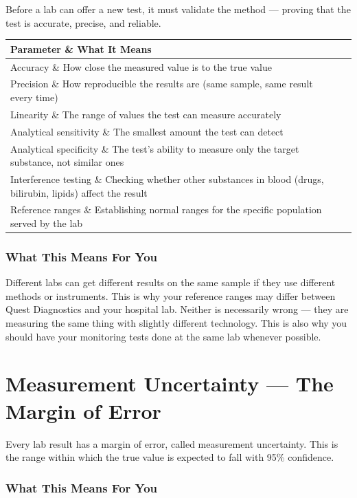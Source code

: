 Before a lab can offer a new test, it must validate the method --- proving that the test is accurate, precise, and reliable.

\begin{longtable}{@{}ll@{}}
\toprule
\textbf{Parameter} \& \textbf{What It Means} \\
\midrule
Accuracy \& How close the measured value is to the true value \\
Precision \& How reproducible the results are (same sample, same result every time) \\
Linearity \& The range of values the test can measure accurately \\
Analytical sensitivity \& The smallest amount the test can detect \\
Analytical specificity \& The test's ability to measure only the target substance, not similar ones \\
Interference testing \& Checking whether other substances in blood (drugs, bilirubin, lipids) affect the result \\
Reference ranges \& Establishing normal ranges for the specific population served by the lab \\
\bottomrule
\end{longtable}

\subsubsection{What This Means For You}

Different labs can get different results on the same sample if they use different methods or instruments. This is why your reference ranges may differ between Quest Diagnostics and your hospital lab. Neither is necessarily wrong --- they are measuring the same thing with slightly different technology. This is also why you should have your monitoring tests done at the same lab whenever possible.

\clearpage
\section{Measurement Uncertainty --- The Margin of Error}

Every lab result has a margin of error, called measurement uncertainty. This is the range within which the true value is expected to fall with 95\% confidence.

\subsubsection{What This Means For You}


